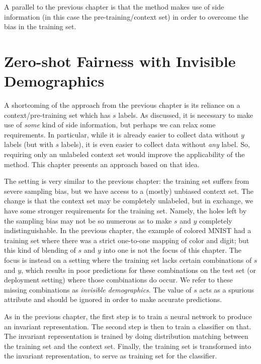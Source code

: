 A parallel to the previous chapter is that the method makes use of side information
(in this case the pre-training/context set)
in order to overcome the bias in the training set.

\section{Zero-shot Fairness with Invisible Demographics}\label{sec:zsf}
A shortcoming of the approach from the previous chapter
is its reliance on a context/pre-training set which has \(s\) labels.
As discussed, it is necessary to make use of \emph{some} kind of side information,
but perhaps we can relax some requirements.
In particular, while it is already easier to collect data without \(y\) labels (but with \(s\) labels),
it is even easier to collect data without \emph{any} label.
So, requiring only an unlabeled context set would improve the applicability of the method.
This chapter presents an approach based on that idea.

The setting is very similar to the previous chapter:
the training set suffers from severe sampling bias, but we have access to a (mostly) unbiased context set.
The change is that the context set may be completely unlabeled,
but in exchange, we have some stronger requirements for the training set.
Namely, the holes left by the sampling bias may not be so numerous
as to make \(s\) and \(y\) completely indistinguishable.
In the previous chapter, the example of colored MNIST had a training set
where there was a strict one-to-one mapping of color and digit;
but this kind of blending of \(s\) and \(y\) into one is not the focus of this chapter.
The focus is instead on a setting where the training set lacks certain combinations of \(s\) and \(y\),
which results in poor predictions for these combinations on the test set (or deployment setting)
where those combinations do occur.
We refer to these missing combinations as \emph{invisible demographics}.
The value of \(s\) acts as a spurious attribute and should be ignored in order to make accurate predictions.

As in the previous chapter, the first step is to train a neural network to produce an invariant representation.
The second step is then to train a classifier on that.
The invariant representation is trained by doing distribution matching between the training set and the context set.
Finally, the training set is transformed into the invariant representation,
to serve as training set for the classifier.
